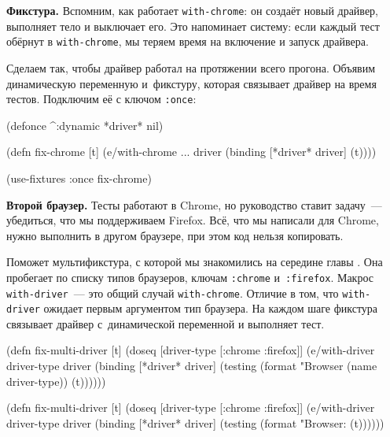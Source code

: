 
\textbf{Фикстура.} Вспомним, как работает \texttt{with\--chrome}: он создаёт новый
драйвер, выполняет тело и выключает его. Это напоминает систему: если каждый
тест обёрнут в \verb|with-chrome|, мы теряем время на включение и запуск
драйвера.

Сделаем так, чтобы драйвер работал на протяжении всего прогона. Объявим
динамическую переменную и~фикстуру, которая связывает драйвер на время
тестов. Подключим её с ключом \verb|:once|:

\begin{english}
  \begin{clojure}
(defonce ^:dynamic *driver* nil)

(defn fix-chrome [t]
  (e/with-chrome {...} driver
    (binding [*driver* driver]
      (t))))

(use-fixtures :once fix-chrome)
  \end{clojure}
\end{english}

\textbf{Второй браузер.} Тесты работают в Chro\-me, но руководство ставит
задачу~--- убедиться, что мы поддерживаем Firefox. Всё, что мы написали для
Chrome, нужно выполнить в другом браузере, при этом код нельзя копировать.

Поможет мультификстура, с которой мы знакомились на середине
главы . Она пробегает по списку типов браузеров, ключам
\verb|:chrome| и~\verb|:firefox|. Макрос \verb|with-driver|~--- это общий случай
\verb|with-chrome|. Отличие в том, что \verb|with-driver| ожидает первым
аргументом тип браузера. На каждом шаге фикстура связывает драйвер
с~динамической переменной и выполняет тест.

\ifnarrow

\begin{english}
  \begin{clojure}
(defn fix-multi-driver [t]
  (doseq [driver-type [:chrome :firefox]]
    (e/with-driver driver-type {} driver
      (binding [*driver* driver]
        (testing (format "Browser %
                   (name driver-type))
          (t))))))
  \end{clojure}
\end{english}

\else

\begin{english}
  \begin{clojure}
(defn fix-multi-driver [t]
  (doseq [driver-type [:chrome :firefox]]
    (e/with-driver driver-type {} driver
      (binding [*driver* driver]
        (testing (format "Browser: %
          (t))))))
  \end{clojure}
\end{english}

